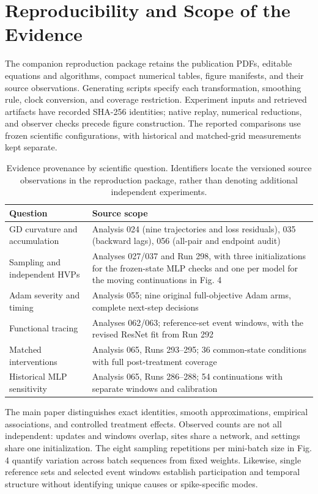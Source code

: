 \clearpage
\section{Reproducibility and Scope of the Evidence}

The companion reproduction package retains the publication PDFs, editable equations and algorithms, compact numerical tables, figure manifests, and their source observations. Generating scripts specify each transformation, smoothing rule, clock conversion, and coverage restriction. Experiment inputs and retrieved artifacts have recorded SHA-256 identities; native replay, numerical reductions, and observer checks precede figure construction. The reported comparisons use frozen scientific configurations, with historical and matched-grid measurements kept separate.

\begin{table}[H]
\centering\small
\caption{Evidence provenance by scientific question. Identifiers locate the versioned source observations in the reproduction package, rather than denoting additional independent experiments.}
\begin{tabular}{@{}lp{4.9in}@{}}
\toprule
Question & Source scope \\
\midrule
GD curvature and accumulation & Analysis 024 (nine trajectories and loss residuals), 035 (backward lags), 056 (all-pair and endpoint audit) \\
Sampling and independent HVPs & Analyses 027/037 and Run 298, with three initializations for the frozen-state MLP checks and one per model for the moving continuations in Fig. 4 \\
Adam severity and timing & Analysis 055; nine original full-objective Adam arms, complete next-step decisions \\
Functional tracing & Analyses 062/063; reference-set event windows, with the revised ResNet fit from Run 292 \\
Matched interventions & Analysis 065, Runs 293--295; 36 common-state conditions with full post-treatment coverage \\
Historical MLP sensitivity & Analysis 065, Runs 286--288; 54 continuations with separate windows and calibration \\
\bottomrule
\end{tabular}
\end{table}

The main paper distinguishes exact identities, smooth approximations, empirical associations, and controlled treatment effects. Observed counts are not all independent: updates and windows overlap, sites share a network, and settings share one initialization. The eight sampling repetitions per mini-batch size in Fig. 4 quantify variation across batch sequences from fixed weights. Likewise, single reference sets and selected event windows establish participation and temporal structure without identifying unique causes or spike-specific modes.

